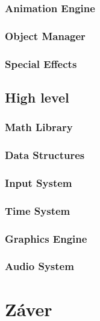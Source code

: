 \documentclass[10pt,twoside,slovak,a4paper,hidelinks]{article}
\begin{document}
\subsubsection{Animation Engine}
\subsubsection{Object Manager}
\subsubsection{Special Effects}
\subsection{High level}
\subsubsection{Math Library}
\subsubsection{Data Structures}
\subsubsection{Input System}
\subsubsection{Time System}
\subsubsection{Graphics Engine}
\subsubsection{Audio System}
\section{Záver}






\end{document}
